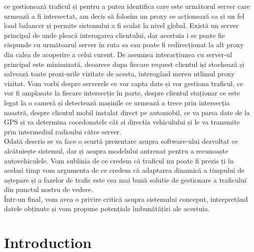 \documentclass[17pt]{report}
\begin{document}
ce gestionează traficul și pentru a putea identifica care este 
următorul server care urmează a fi intersectat, am decis să folosim 
un proxy ce acționează ca și un fel load balancer și permite
sistemului a fi scalat la nivel global. Există un server principal
de unde pleacă interogarea clientului, dar acestuia i se poate fie răspunde cu 
următoarul server în ruta sa sau poate fi redirecționat la alt proxy 
din calea de acoperire a celui curent. De asemnea interacțiunea cu server-ul
principal este minimizată, deoarece dupa fiecare request clientul iși stochează 
și salvează toate proxi-urile vizitate de acesta, interogând mereu utlimul 
proxy vizitat. Vom vorbi despre serverele ce vor capta 
date și vor gestiona traficul, ce vor fi amplasate la fiecare intersecție 
în parte, despre clientul staționar ce este legat la o cameră și
detectează mașinile ce urmează a trece prin intersecția noastră, despre 
clientul mobil instalat direct pe automobil, ce va parsa date de la
GPS și va determina coordonatele cât si directia vehiculului și le va 
transmite prin intermediul radioului către server. \\
\indent \indent 
Odată descris se va face o scurtă prezentare asupra software-ului 
dezvoltat ce alcătuiește sistemul, dar și asupra modelului antrenat
pentru a recunoaște autovehiculele. Vom sublinia de ce credem că
traficul nu poate fi prezis ți în același timp vom argumenta de ce
credem că adaptarea dinamică a timpului de aștepare și a fazelor de trafic
este cea mai bună solutie de gestionare a traficului din punctul nostru 
de vedere.\\
\indent \indent
Într-un final, vom avea o privire critică asupra sistemului conceput, 
interpretând datele obținute și vom propune potențiale îmbunătățiri
ale acestuia.
\pagebreak

\tableofcontents


\listoffigures
\pagebreak

\chapter{Introduction}
\end{document}
